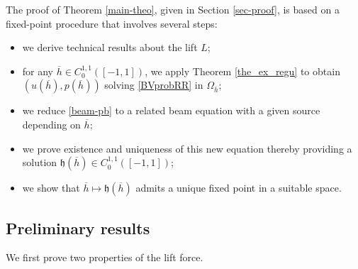\documentclass[11pt,a4paper]{amsart}
\theoremstyle{remark}
\theoremstyle{definition}
\numberwithin{equation}{section}
\numberwithin{proposition}{section}
\begin{document}
The proof of Theorem \ref{main-theo}, given in Section \ref{sec-proof}, is based on a fixed-point procedure that involves several steps:
\begin{itemize}
\item we derive technical results about the lift $L$;
\item for any $\overline{h}\in C^{1,1}_0([-1,1])$, we apply Theorem \ref{the_ex_regu} to obtain   $(u(\overline{h}), p(\overline{h}))$ solving \eqref{BVprobRR} in $\Omega_{\overline{h}}$;

\item we reduce \eqref{beam-pb} to
a related beam equation with a given source depending on $\overline{h}$;
\item we prove existence and uniqueness of this new equation thereby providing a solution $\mathfrak{h}(\overline{h})\in C^{1,1}_0([-1,1])$;
\item we show that $\overline{h}\mapsto \mathfrak{h}(\overline{h})$ admits a unique fixed point in a suitable space.
\end{itemize}




\subsection{Preliminary results}
We first prove two properties of the lift force.
\end{document}
